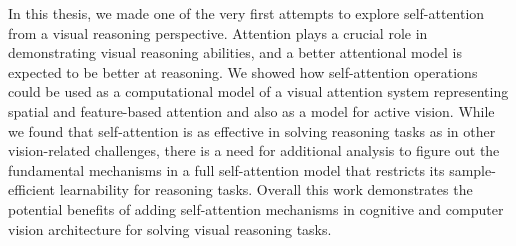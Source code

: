In this thesis, we made one of the very first attempts to explore self-attention from a visual reasoning perspective. Attention plays a crucial role in demonstrating visual reasoning abilities, and a better attentional model is expected to be better at reasoning. We showed how self-attention operations could be used as a computational model of a visual attention system representing spatial and feature-based attention and also as a model for active vision. While we found that self-attention is as effective in solving reasoning tasks as in other vision-related challenges, there is a need for additional analysis to figure out the fundamental mechanisms in a full self-attention model that restricts its sample-efficient learnability for reasoning tasks. Overall this work demonstrates the potential benefits of adding self-attention mechanisms in cognitive and computer vision architecture for solving visual reasoning tasks. 